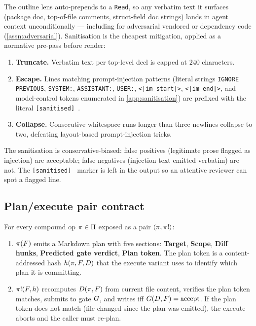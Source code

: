The outline lens auto-prepends to a \texttt{Read}, so any verbatim
text it surfaces (package doc, top-of-file comments, struct-field
doc strings) lands in agent context unconditionally --- including for
adversarial vendored or dependency code (\cref{assn:adversarial}).
Sanitisation is the cheapest mitigation, applied as a normative
pre-pass before render:

\begin{enumerate}[leftmargin=*]
  \item \textbf{Truncate.} Verbatim text per top-level decl is capped
        at $240$ characters.
  \item \textbf{Escape.} Lines matching prompt-injection patterns
        (literal strings \texttt{IGNORE PREVIOUS}, \texttt{SYSTEM:},
        \texttt{ASSISTANT:}, \texttt{USER:},
        \texttt{<|im\_start|>}, \texttt{<|im\_end|>}, and
        model-control tokens enumerated in \cref{app:sanitisation})
        are prefixed with the literal \texttt{[sanitised]~}.
  \item \textbf{Collapse.} Consecutive whitespace runs longer than
        three newlines collapse to two, defeating layout-based
        prompt-injection tricks.
\end{enumerate}

The sanitisation is conservative-biased: false positives (legitimate
prose flagged as injection) are acceptable; false negatives (injection
text emitted verbatim) are not. The \texttt{[sanitised]~} marker is
left in the output so an attentive reviewer can spot a flagged line.

\subsection{Plan/execute pair contract}
\label{sec:algorithm:planexecute}

For every compound op $\pi \in \Pi$ exposed as a pair
$\langle \pi, \pi! \rangle$:

\begin{enumerate}[leftmargin=*]
  \item $\pi(F)$ emits a Markdown plan with five sections:
        \textbf{Target}, \textbf{Scope}, \textbf{Diff hunks},
        \textbf{Predicted gate verdict}, \textbf{Plan token}. The
        plan token is a content-addressed hash $h(\pi, F,
        D)$ that the execute variant uses to identify which
        plan it is committing.
  \item $\pi!(F, h)$ recomputes $D(\pi, F)$
        from current file content, verifies the plan token matches,
        submits to gate $G$, and writes iff $G(D, F)
        = \text{accept}$. If the plan token does not match (file
        changed since the plan was emitted), the execute aborts and
        the caller must re-plan.
\end{enumerate}

